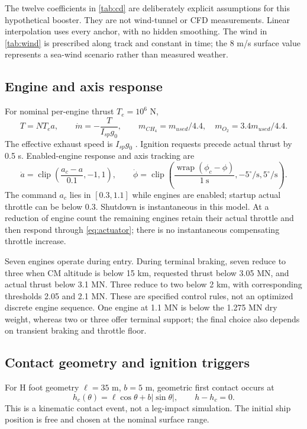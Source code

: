 \documentclass[11pt,a4paper]{article}
\begin{document}


The twelve coefficients in \cref{tab:cd} are deliberately explicit assumptions for this hypothetical booster. They are not wind-tunnel or CFD measurements. Linear interpolation uses every anchor, with no hidden smoothing. The wind in \cref{tab:wind} is prescribed along track and constant in time; the 8 m/s surface value represents a sea-wind scenario rather than measured weather.

\subsection{Engine and axis response}
For nominal per-engine thrust $T_e=10^6$ N,
\begin{equation}
T=NT_ea,\qquad \dot m=-\frac{T}{I_{sp}g_0},\qquad
m_{CH_4}=m_{used}/4.4,\quad m_{O_2}=3.4m_{used}/4.4.
\label{eq:mass}\end{equation}
The effective exhaust speed is $I_{sp}g_0$ \cite{isp}. Ignition requests precede actual thrust by 0.5 s. Enabled-engine response and axis tracking are
\begin{equation}
\dot a=\operatorname{clip}\!\left(\frac{a_c-a}{0.1},-1,1\right),\qquad
\dot\phi=\operatorname{clip}\!\left(\frac{\operatorname{wrap}(\phi_c-\phi)}{1\ \mathrm{s}},-5^\circ/\mathrm{s},5^\circ/\mathrm{s}\right).
\label{eq:actuator}\end{equation}
The command $a_c$ lies in $[0.3,1.1]$ while engines are enabled; startup actual throttle can be below 0.3. Shutdown is instantaneous in this model. At a reduction of engine count the remaining engines retain their actual throttle and then respond through \cref{eq:actuator}; there is no instantaneous compensating throttle increase.

Seven engines operate during entry. During terminal braking, seven reduce to three when CM altitude is below 15 km, requested thrust below 3.05 MN, and actual thrust below 3.1 MN. Three reduce to two below 2 km, with corresponding thresholds 2.05 and 2.1 MN. These are specified control rules, not an optimized discrete engine sequence. One engine at 1.1 MN is below the 1.275 MN dry weight, whereas two or three offer terminal support; the final choice also depends on transient braking and throttle floor.

\subsection{Contact geometry and ignition triggers}
For H foot geometry $\ell=35$ m, $b=5$ m, geometric first contact occurs at
\begin{equation}
 h_c(\theta)=\ell\cos\theta+b|\sin\theta|,\qquad h-h_c=0.
\label{eq:contact}\end{equation}
This is a kinematic contact event, not a leg-impact simulation. The initial ship position is free and chosen at the nominal surface range.
\end{document}
